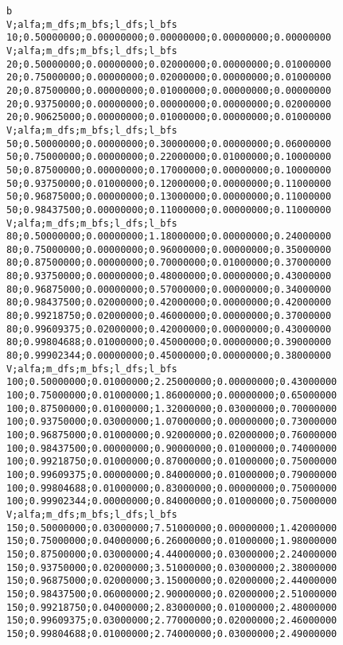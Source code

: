 \documentclass[brazil,times]{abnt}
\begin{document}
\begin{verbatim}
b
V;alfa;m_dfs;m_bfs;l_dfs;l_bfs
10;0.50000000;0.00000000;0.00000000;0.00000000;0.00000000
V;alfa;m_dfs;m_bfs;l_dfs;l_bfs
20;0.50000000;0.00000000;0.02000000;0.00000000;0.01000000
20;0.75000000;0.00000000;0.02000000;0.00000000;0.01000000
20;0.87500000;0.00000000;0.01000000;0.00000000;0.00000000
20;0.93750000;0.00000000;0.00000000;0.00000000;0.02000000
20;0.90625000;0.00000000;0.01000000;0.00000000;0.01000000
V;alfa;m_dfs;m_bfs;l_dfs;l_bfs
50;0.50000000;0.00000000;0.30000000;0.00000000;0.06000000
50;0.75000000;0.00000000;0.22000000;0.01000000;0.10000000
50;0.87500000;0.00000000;0.17000000;0.00000000;0.10000000
50;0.93750000;0.01000000;0.12000000;0.00000000;0.11000000
50;0.96875000;0.00000000;0.13000000;0.00000000;0.11000000
50;0.98437500;0.00000000;0.11000000;0.00000000;0.11000000
V;alfa;m_dfs;m_bfs;l_dfs;l_bfs
80;0.50000000;0.00000000;1.18000000;0.00000000;0.24000000
80;0.75000000;0.00000000;0.96000000;0.00000000;0.35000000
80;0.87500000;0.00000000;0.70000000;0.01000000;0.37000000
80;0.93750000;0.00000000;0.48000000;0.00000000;0.43000000
80;0.96875000;0.00000000;0.57000000;0.00000000;0.34000000
80;0.98437500;0.02000000;0.42000000;0.00000000;0.42000000
80;0.99218750;0.02000000;0.46000000;0.00000000;0.37000000
80;0.99609375;0.02000000;0.42000000;0.00000000;0.43000000
80;0.99804688;0.01000000;0.45000000;0.00000000;0.39000000
80;0.99902344;0.00000000;0.45000000;0.00000000;0.38000000
V;alfa;m_dfs;m_bfs;l_dfs;l_bfs
100;0.50000000;0.01000000;2.25000000;0.00000000;0.43000000
100;0.75000000;0.01000000;1.86000000;0.00000000;0.65000000
100;0.87500000;0.01000000;1.32000000;0.03000000;0.70000000
100;0.93750000;0.03000000;1.07000000;0.00000000;0.73000000
100;0.96875000;0.01000000;0.92000000;0.02000000;0.76000000
100;0.98437500;0.00000000;0.90000000;0.01000000;0.74000000
100;0.99218750;0.01000000;0.87000000;0.01000000;0.75000000
100;0.99609375;0.00000000;0.84000000;0.01000000;0.79000000
100;0.99804688;0.01000000;0.83000000;0.00000000;0.75000000
100;0.99902344;0.00000000;0.84000000;0.01000000;0.75000000
V;alfa;m_dfs;m_bfs;l_dfs;l_bfs
150;0.50000000;0.03000000;7.51000000;0.00000000;1.42000000
150;0.75000000;0.04000000;6.26000000;0.01000000;1.98000000
150;0.87500000;0.03000000;4.44000000;0.03000000;2.24000000
150;0.93750000;0.02000000;3.51000000;0.03000000;2.38000000
150;0.96875000;0.02000000;3.15000000;0.02000000;2.44000000
150;0.98437500;0.06000000;2.90000000;0.02000000;2.51000000
150;0.99218750;0.04000000;2.83000000;0.01000000;2.48000000
150;0.99609375;0.03000000;2.77000000;0.02000000;2.46000000
150;0.99804688;0.01000000;2.74000000;0.03000000;2.49000000

\end{verbatim}
\end{document}
